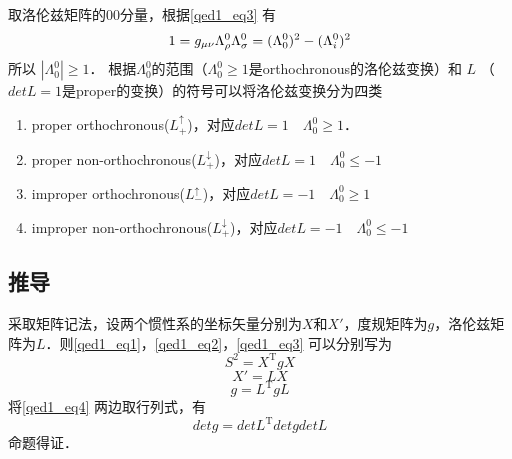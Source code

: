取洛伦兹矩阵的00分量，根据\autoref{qed1_eq3} 有
\begin{equation}
1=g_{\mu \nu} \Lambda_{\rho}^{0} \Lambda_{\sigma}^{0}= (\Lambda_{0}^{0})^2- (\Lambda_{i}^{0})^2\\
\end{equation}
所以 $\left|\Lambda_{0}^{0} \right|\geqslant1$． 根据$\Lambda_{0}^{0}$的范围（$\Lambda_{0}^{0}\geqslant1$是orthochronous的洛伦兹变换）和 $L$ （$detL=1$是proper的变换）的符号可以将洛伦兹变换分为四类
\begin{enumerate}
\item proper orthochronous($L_{+}^{\uparrow}$)，对应$detL=1\quad \Lambda_{0}^{0}\geqslant1$．
\item proper non-orthochronous($L_{+}^{\downarrow}$)，对应$detL=1\quad \Lambda_{0}^{0}\leqslant-1$
\item improper orthochronous($L_{-}^{\uparrow}$)，对应$detL=-1 \quad\Lambda_{0}^{0}\geqslant1$
\item improper non-orthochronous($L_{+}^{\downarrow}$)，对应$detL=-1 \quad\Lambda_{0}^{0}\leqslant-1$
\end{enumerate}
\subsection{推导}
采取矩阵记法，设两个惯性系的坐标矢量分别为$X$和$X'$，度规矩阵为$g$，洛伦兹矩阵为$L$．则\autoref{qed1_eq1}，\autoref{qed1_eq2}，\autoref{qed1_eq3} 可以分别写为
\begin{equation}
S^{2}=X^{\mathrm{T}} g X
\end{equation}
\begin{equation}
X'=LX
\end{equation}
\begin{equation}\label{qed1_eq4}
g=L^{\mathrm{T}} g L
\end{equation}
将\autoref{qed1_eq4} 两边取行列式，有
\begin{equation}
detg=detL^{\mathrm{T}} detg detL
\end{equation}
命题得证．
